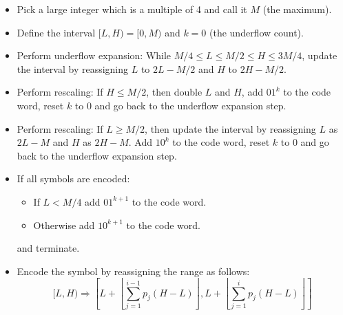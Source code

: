\begin{itemize}
  \item Pick a large integer which is a multiple of 4 and call it $M$ (the maximum).
  \item Define the interval $[L, H) = [0, M)$ and $k=0$ (the underflow count).
  \item Perform underflow expansion: While $M/4 \leq L \leq M/2 \leq H \leq 3M/4$, update the interval by reassigning $L$ to $2L-M/2$ and $H$ to $2H-M/2$.
  \item Perform rescaling: If $H \le M/2$, then double $L$ and $H$, add $01^k$ to the code word, reset $k$ to 0 and go back to the underflow expansion step.
  \item Perform rescaling: If $L \ge M/2$, then update the interval by reassigning $L$ as $2L-M$ and $H$ as $2H-M$. Add $10^k$ to the code word, reset $k$ to 0 and go back to the underflow expansion step.
  \item If all symbols are encoded:
  \begin{itemize}
    \item If $L < M/4$ add $01^{k+1}$ to the code word.
    \item Otherwise add $10^{k+1}$ to the code word.
  \end{itemize}
  and terminate.
  \item Encode the symbol by reassigning the range as follows:
  $$
  [L, H) \Rightarrow \left[L+\left\lfloor\sum_{j=1}^{i-1} p_j(H-L)\right\rfloor, L+\left\lfloor\sum_{j=1}^{i} p_j(H-L)\right\rfloor\right]
  $$
\end{itemize}

